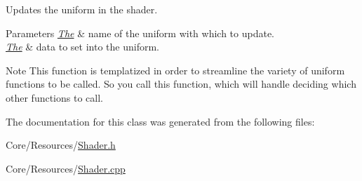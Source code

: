 Updates the uniform in the shader. 


\begin{DoxyParams}{Parameters}
{\em \hyperlink{classThe}{The}} & name of the uniform with which to update. \\
\hline
{\em \hyperlink{classThe}{The}} & data to set into the uniform. \\
\hline
\end{DoxyParams}
\begin{DoxyNote}{Note}
This function is templatized in order to streamline the variety of uniform functions to be called. So you call this function, which will handle deciding which other functions to call. 
\end{DoxyNote}


The documentation for this class was generated from the following files\-:\begin{DoxyCompactItemize}
\item 
Core/\-Resources/\hyperlink{Shader_8h}{Shader.\-h}\item 
Core/\-Resources/\hyperlink{Shader_8cpp}{Shader.\-cpp}\end{DoxyCompactItemize}
